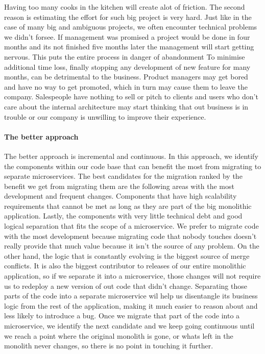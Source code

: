 \documentclass[a4paper, 11pt]{book}
\begin{document}
    Having too many cooks in the kitchen will create alot of friction.
    The second reason is estimating the effort for such big project is very hard.
    Just like in the case of many big and ambiguous projects, we often encounter technical problems we didn't forsee.
    If management was promised a project would be done in four months and its not finished five months later the management will start getting nervous.
    This puts the entire process in danger of abandonment
    To minimise additional time loss, finally stopping any development of new feature for many months, can be detrimental to the business.
    Product managers may get bored and have no way to get promoted, which in turn may cause them to leave the company.
    Salespeople have nothing to sell or pitch to clients and users who don't care about the internal architecture may start thinking that out business is in trouble or our company is unwilling to improve their experience.

    \paragraph{The better approach}
    The better approach is incremental and continuous.
    In this approach, we identify the components within our code base that can benefit the most from migrating to separate microservices.
    The best candidates for the migration ranked by the benefit we get from migrating them are the following areas with the most development and frequent changes.
    Components that have high scalability requirements that cannot be met as long as they are part of the big monolithic application.
    Lastly, the components with very little technical debt and good logical separation that fits the scope of a microservice.
    We prefer to migrate code with the most development because migrating code that nobody touches doesn't really provide that much value because it isn't the source of any problem.
    On the other hand, the logic that is constantly evolving is the biggest source of merge conflicts.
    It is also the biggest contributor to releases of our entire monolithic application, so if we separate it into a microservice, those changes will not require us to redeploy a new version of out code that didn't change.
    Separating those parts of the code into a separate microservice wil help us disentangle its business logic from the rest of the application, making it much easier to reason about and less likely to introduce a bug.
    Once we migrate that part of the code into a microservice, we identify the next candidate and we keep going continuous until we reach a point where the original monolith is gone, or whats left in the monolith never changes, so there is no point in touching it further.
\end{document}
